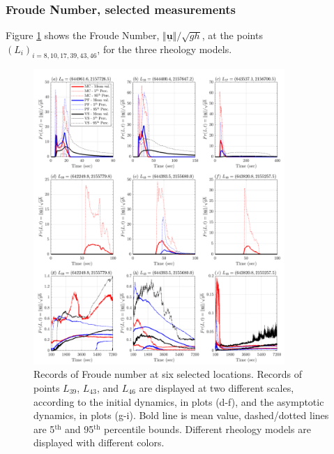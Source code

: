 \documentclass{article}
\begin{document}
\subsubsection{Froude Number, selected measurements}
Figure \ref{fig:Colima-Fr1} shows the Froude Number, $\Vert \underline{\mathbf{u}} \Vert/\sqrt{gh}$, at the points $(L_i)_{i=8,10,17,39,43,46}$, for the three rheology models.
\begin{figure}[H]
         \centering
        \includegraphics[width=0.85\textwidth]{BAF_VolcanDeColima/LocalMeasurments/Froude12.png}
        \caption{Records of Froude number at six selected locations. Records of points $L_{39}$, $L_{43}$, and $L_{46}$ are displayed at two different scales, according to the initial dynamics, in plots (d-f), and the asymptotic dynamics, in plots (g-i). Bold line is mean value, dashed/dotted lines are 5$^{\mathrm{th}}$ and 95$^{\mathrm{th}}$ percentile bounds. Different rheology models are displayed with different colors.}
        \label{fig:Colima-Fr1}
\end{figure}
\end{document}
